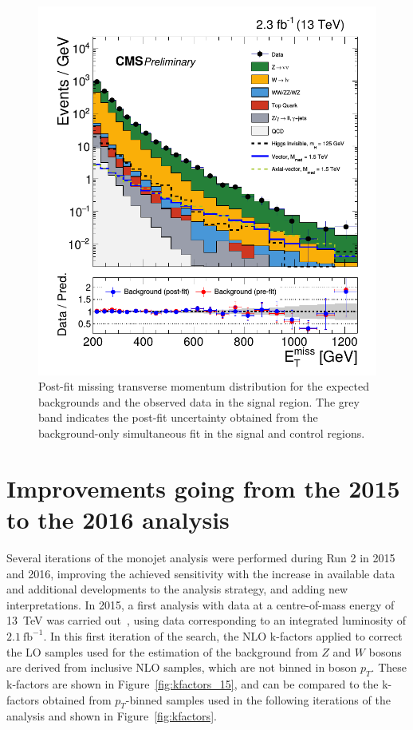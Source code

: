 \begin{figure}[ht]
  \centering
 \includegraphics[width=.7\textwidth]{results.png} 
 \caption{Post-fit missing transverse momentum distribution for the expected backgrounds and the observed data in the signal region. The grey band indicates the post-fit uncertainty obtained from the background-only simultaneous fit in the signal and control regions.}
 \label{fig:results}
\end{figure}

\section{Improvements going from the 2015 to the 2016 analysis}
\label{sec:improvement}

Several iterations of the monojet analysis were performed during Run 2 in 2015 and 2016, improving the achieved sensitivity with the increase in available data and additional developments to the analysis strategy, and adding new interpretations. In 2015, a first analysis with data at a centre-of-mass energy of \SI{13}{TeV} was carried out~\cite{CMS:2015jdt}, using data corresponding to an integrated luminosity of $2.1\ \mathrm{fb}^{-1}$. In this first iteration of the search, the NLO k-factors applied to correct the \ac{LO} samples used for the estimation of the background from $Z$ and $W$ bosons are derived from inclusive \ac{NLO} samples, which are not binned in boson $p_T$. These k-factors are shown in Figure~\ref{fig:kfactors_15}, and can be compared to the k-factors obtained from $p_T$-binned samples used in the following iterations of the analysis and shown in Figure~\ref{fig:kfactors}.

